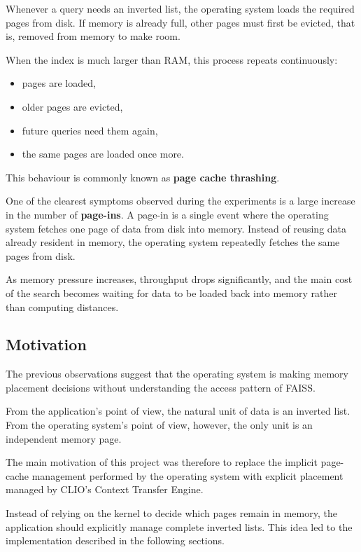\documentclass[11pt]{article}
\begin{document}
Whenever a query needs an inverted list, the operating system loads
the required pages from disk. If memory is already full, other pages
must first be evicted, that is, removed from memory to make room.

When the index is much larger than RAM, this process repeats
continuously:

\begin{itemize}
\item pages are loaded,
\item older pages are evicted,
\item future queries need them again,
\item the same pages are loaded once more.
\end{itemize}

This behaviour is commonly known as \textbf{page cache thrashing}.

One of the clearest symptoms observed during the experiments is a
large increase in the number of \textbf{page-ins}. A page-in is a
single event where the operating system fetches one page of data
from disk into memory. Instead of reusing data already resident in
memory, the operating system repeatedly fetches the same pages from
disk.

As memory pressure increases, throughput drops significantly, and
the main cost of the search becomes waiting for data to be loaded
back into memory rather than computing distances.

\subsection{Motivation}

The previous observations suggest that the operating system is
making memory placement decisions without understanding the access
pattern of FAISS.

From the application's point of view, the natural unit of data is an
inverted list. From the operating system's point of view, however,
the only unit is an independent memory page.

The main motivation of this project was therefore to replace the
implicit page-cache management performed by the operating system with
explicit placement managed by CLIO's Context Transfer Engine.

Instead of relying on the kernel to decide which pages remain in
memory, the application should explicitly manage complete inverted
lists. This idea led to the implementation described in the following
sections.
\end{document}
